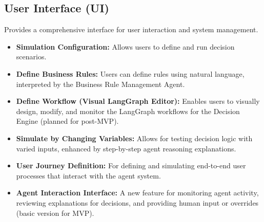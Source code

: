 \documentclass{article}
\begin{document}
\subsection{User Interface (UI)}
Provides a comprehensive interface for user interaction and system management.
\begin{itemize}
    \item \textbf{Simulation Configuration:} Allows users to define and run decision scenarios.
    \item \textbf{Define Business Rules:} Users can define rules using natural language, interpreted by the Business Rule Management Agent.
    \item \textbf{Define Workflow (Visual LangGraph Editor):} Enables users to visually design, modify, and monitor the LangGraph workflows for the Decision Engine (planned for post-MVP).
    \item \textbf{Simulate by Changing Variables:} Allows for testing decision logic with varied inputs, enhanced by step-by-step agent reasoning explanations.
    \item \textbf{User Journey Definition:} For defining and simulating end-to-end user processes that interact with the agent system.
    \item \textbf{Agent Interaction Interface:} A new feature for monitoring agent activity, reviewing explanations for decisions, and providing human input or overrides (basic version for MVP).
\end{itemize}
\end{document}
